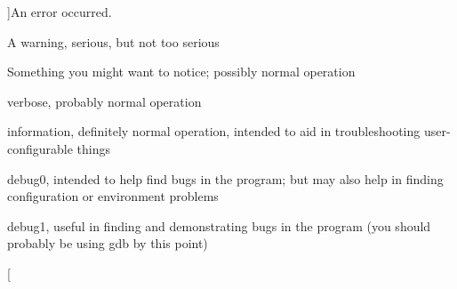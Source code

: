 \begin{Desc}
\begin{description}
{}]An error occurred. \item[{\em 
UPK\_\-DIAGLVL\_\-WARN\label{group__upk__errors_ga69a581dfd708ad2e18688e01cbcc0ff8a28fff8a74dfb72e3c0fad13c8fcd6168}
}]A warning, serious, but not too serious \item[{\em 
UPK\_\-DIAGLVL\_\-NOTICE\label{group__upk__errors_ga69a581dfd708ad2e18688e01cbcc0ff8a2d096c4906e4df530e7b2368d0169558}
}]Something you might want to notice; possibly normal operation \item[{\em 
UPK\_\-DIAGLVL\_\-VERBOSE\label{group__upk__errors_ga69a581dfd708ad2e18688e01cbcc0ff8af4ab159278a3a1599c370e89858ec888}
}]verbose, probably normal operation \item[{\em 
UPK\_\-DIAGLVL\_\-INFO\label{group__upk__errors_ga69a581dfd708ad2e18688e01cbcc0ff8a2bb69eb89e08c5587c87186e04b0aaa8}
}]information, definitely normal operation, intended to aid in troubleshooting user-\/configurable things \item[{\em 
UPK\_\-DIAGLVL\_\-DEBUG0\label{group__upk__errors_ga69a581dfd708ad2e18688e01cbcc0ff8af6a6be2812d975c859910213b5361e39}
}]debug0, intended to help find bugs in the program; but may also help in finding configuration or environment problems \item[{\em 
UPK\_\-DIAGLVL\_\-DEBUG1\label{group__upk__errors_ga69a581dfd708ad2e18688e01cbcc0ff8a77aa4e5c1c3416dea8d1e7299aaa1530}
}]debug1, useful in finding and demonstrating bugs in the program (you should probably be using gdb by this point) \item[{\em 
}
\end{description}
\end{Desc}
